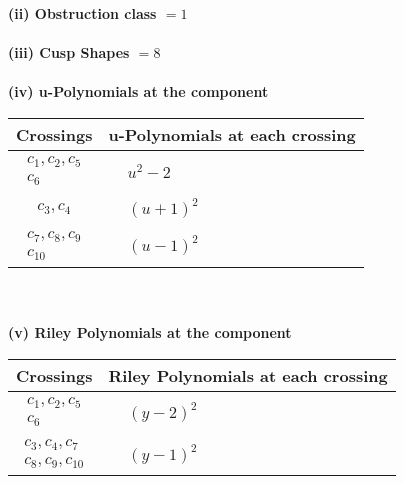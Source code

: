 \documentclass[1p]{elsarticle_modified}
\theoremstyle{definition}
\begin{document}
\flushleft \textbf{(ii) Obstruction class $= 1$}\\~\\
\flushleft \textbf{(iii) Cusp Shapes $= 8$}\\~\\
\newpage\renewcommand{\arraystretch}{1}
\flushleft \textbf{(iv) u-Polynomials at the component}\newline \\
\begin{tabular}{m{50pt}|m{274pt}}
Crossings & \hspace{64pt}u-Polynomials at each crossing \\
\hline $$\begin{aligned}c_{1},c_{2},c_{5}\\c_{6}\end{aligned}$$&$\begin{aligned}
&u^2-2
\end{aligned}$\\
\hline $$\begin{aligned}c_{3},c_{4}\end{aligned}$$&$\begin{aligned}
&(u+1)^2
\end{aligned}$\\
\hline $$\begin{aligned}c_{7},c_{8},c_{9}\\c_{10}\end{aligned}$$&$\begin{aligned}
&(u-1)^2
\end{aligned}$\\
\hline
\end{tabular}\\~\\
\newpage\renewcommand{\arraystretch}{1}
\flushleft \textbf{(v) Riley Polynomials at the component}\newline \\
\begin{tabular}{m{50pt}|m{274pt}}
Crossings & \hspace{64pt}Riley Polynomials at each crossing \\
\hline $$\begin{aligned}c_{1},c_{2},c_{5}\\c_{6}\end{aligned}$$&$\begin{aligned}
&(y-2)^2
\end{aligned}$\\
\hline $$\begin{aligned}c_{3},c_{4},c_{7}\\c_{8},c_{9},c_{10}\end{aligned}$$&$\begin{aligned}
&(y-1)^2
\end{aligned}$\\
\hline
\end{tabular}\\~\\
\end{document}
